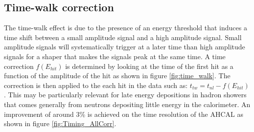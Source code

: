 \documentclass{JINST}
\begin{document}
\subsection{Time-walk correction}
\label{sec:TWCorr}

The time-walk effect is due to the presence of an energy threshold that induces a time shift between a small amplitude signal and a high amplitude signal. Small amplitude signals will systematically trigger at a later time than high amplitude signals for a shaper that makes the signals peak at the same time. A time correction $f(E_{hit})$ is determined by looking at the time of the first hit as a function of the amplitude of the hit as shown in figure \ref{fig:time_walk}. The correction is then applied to the each hit in the data such as: $t_{tw} = t_{nl} - f(E_{hit})$. This may be particularly relevant for late energy depositions in hadron showers that comes generally from neutrons depositing little energy in the calorimeter. An improvement of around 3\% is achieved on the time resolution of the AHCAL as shown in figure \ref{fig:Timing_AllCorr}.
\end{document}
